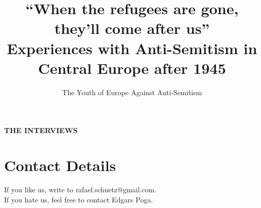 \documentclass{book}
\title{``When the refugees are gone, they'll come after us''\\ Experiences with Anti-Semitism in Central Europe after 1945}
\author{The Youth of Europe Against Anti-Semitism}
\date{}
\begin{document}
	\setlength{\parindent}{0pt}
	\setlength{\parskip}{1em}
\maketitle 
\thispagestyle{empty}
\tableofcontents

\newpage
\thispagestyle{empty}
\vspace*{15em}
 \textbf{\Huge{THE INTERVIEWS}} 




















\nocite{*}
\printbibliography
\newpage
\section{Contact Details}
If you like us, write to rafael.schuetz@gmail.com.\\ If you hate us, feel free to contact Edgars Poga.
\end{document}

